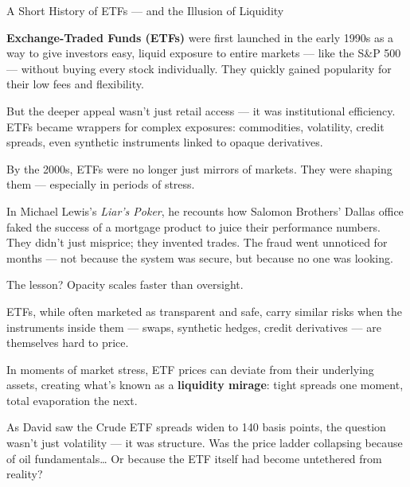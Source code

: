 \begin{HistoricalSidebar}{A Short History of ETFs — and the Illusion of Liquidity}

  \textbf{Exchange-Traded Funds (ETFs)} were first launched in the early 1990s as a way to give investors easy, 
  liquid exposure to entire markets — like the S\&P 500 — without buying every stock individually. They quickly 
  gained popularity for their low fees and flexibility.
  
  \medskip
  
  But the deeper appeal wasn’t just retail access — it was institutional efficiency. ETFs became wrappers for 
  complex exposures: commodities, volatility, credit spreads, even synthetic instruments linked to opaque derivatives. 
  
  \medskip
  
  By the 2000s, ETFs were no longer just mirrors of markets. They were shaping them — especially in periods of stress.
  
  \medskip
  
  In Michael Lewis’s \textit{Liar’s Poker}, he recounts how Salomon Brothers’ Dallas office faked the success of a 
  mortgage product to juice their performance numbers. They didn’t just misprice; they invented trades. The fraud 
  went unnoticed for months — not because the system was secure, but because no one was looking.  

  
  \medskip
  
  The lesson?  
  Opacity scales faster than oversight.
  
  \medskip
  
  ETFs, while often marketed as transparent and safe, carry similar risks when the instruments inside them — swaps, 
  synthetic hedges, credit derivatives — are themselves hard to price.  

  
  \medskip
  
  In moments of market stress, ETF prices can deviate from their underlying assets, creating what’s known as a 
  \textbf{liquidity mirage}: tight spreads one moment, total evaporation the next.
  
  \medskip
  
  As David saw the Crude ETF spreads widen to 140 basis points, the question wasn’t just volatility — it was structure.  
  Was the price ladder collapsing because of oil fundamentals…  
  Or because the ETF itself had become untethered from reality?
  
\end{HistoricalSidebar}

